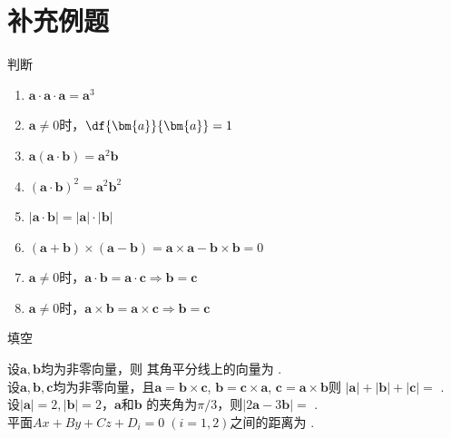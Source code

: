 \section{补充例题}

\begin{frame}{判断}
	\linespread{1.2}
	\begin{enumerate}
	  \item $\bm{a}\cdot\bm{a}\cdot\bm{a}=\bm{a}^3$\quad\pause\ba{$\times$}\pause
	  \item $\bm{a}\ne 0$时，$\df{\bm{a}}{\bm{a}}=1$\quad\pause\ba{$\times$}\pause
	  \item $\bm{a}(\bm{a}\cdot\bm{b})=\bm{a}^2\bm{b}$
	    \quad\pause\ba{$\times$}\pause
	  \item $(\bm{a}\cdot\bm{b})^2=\bm{a}^2\bm{b}^2$\quad\pause\ba{$\times$}\pause
	  \item $|\bm{a}\cdot\bm{b}|=|\bm{a}|\cdot|\bm{b}|$
		\quad\pause\ba{$\times$}\pause
	  \item $(\bm{a}+\bm{b})\times(\bm{a}-\bm{b})=\bm{a}\times\bm{a}
  		-\bm{b}\times\bm{b}=0$
  		\quad\pause\ba{$\times$}\pause
  	  \item $\bm{a}\ne 0$时，$\bm{a}\cdot\bm{b}
  	  	=\bm{a}\cdot\bm{c}\Rightarrow\bm{b}=\bm{c}$
  	  	\quad\pause\ba{$\times$}\pause
  	  \item  $\bm{a}\ne 0$时，$\bm{a}\times\bm{b}
  	  	=\bm{a}\times\bm{c}\Rightarrow\bm{b}=\bm{c}$
  	  	\quad\pause\ba{$\times$}
	\end{enumerate}
\end{frame}

\begin{frame}{填空}
	\linespread{1.2}
	
	\;设$\bm{a},\bm{b}$均为非零向量，则
	其角平分线上的向量为
	\underline{\;}.\\[1em]
	
	\;设$\bm{a},\bm{b},\bm{c}$均为非零向量，且$\bm{a}=\bm{b}\times\bm{c}$,
	$\bm{b}=\bm{c}\times\bm{a}$,
	$\bm{c}=\bm{a}\times\bm{b}$则
	$|\bm{a}|+|\bm{b}|+|\bm{c}|=$
	\underline{\;}.\\[1em]

	\;设$|\bm{a}|=2,|\bm{b}|=2$，$\bm{a}$和$\bm{b}$
	的夹角为$\pi/3$，则$|2\bm{a}-3\bm{b}|=$
	\underline{\;}.\\[1em]
		
	\;平面$Ax+By+Cz+D_i=0\;(i=1,2)$之间的距离为
	\underline{\;}.
\end{frame}

